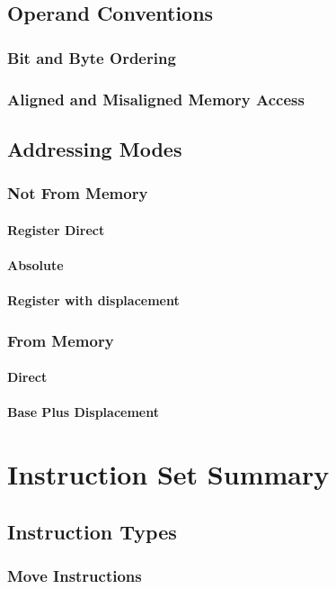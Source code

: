 \documentclass[twoside,a4paper]{memoir}
\begin{document}
\section{Operand Conventions}
\subsection{Bit and Byte Ordering}
\subsection{Aligned and Misaligned Memory Access}
\section{Addressing Modes}
\subsection{Not From Memory}
\subsubsection{Register Direct}
\subsubsection{Absolute}
\subsubsection{Register with displacement}
\subsection{From Memory}
\subsubsection{Direct}
\subsubsection{Base Plus Displacement}

\chapter{Instruction Set Summary}
\section{Instruction Types}
\subsection{Move Instructions}
\end{document}
